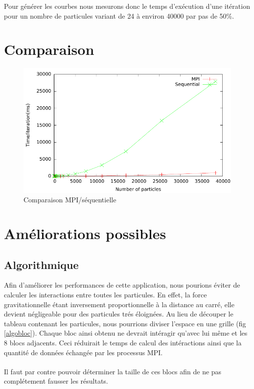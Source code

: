 \documentclass{article}
\begin{document}
Pour générer les courbes nous mesurons donc le temps d'exécution d'une itération pour un nombre de particules variant de 24 à environ 40000 par pas de 50\%.

\section{Comparaison}

\begin{figure}[h]
  \centering
  \includegraphics[scale=0.7]{ResultTDP2/seq_mpi.pdf}
  \caption{\label{seq_mpi}Comparaison MPI/séquentielle}
\end{figure}



\section{Améliorations possibles}
\subsection{Algorithmique}
Afin d'améliorer les performances de cette application, nous pourions éviter de calculer les interactions entre toutes les particules. En effet, la force gravitationnelle étant inversement proportionnelle à la distance au carré, elle devient négligeable pour des particules trés éloignées. Au lieu de découper le tableau contenant les particules, nous pourrions diviser l'espace en une grille (fig \ref{algobloc}). Chaque bloc ainsi obtenu ne devrait intéragir qu'avec lui même et les 8 blocs adjacents. Ceci réduirait le temps de calcul des intéractions ainsi que la quantité de données échangée par les processus MPI.

\paragraph{} 
Il faut par contre pouvoir déterminer la taille de ces blocs afin de ne pas complétement fausser les résultats. 
\end{document}
